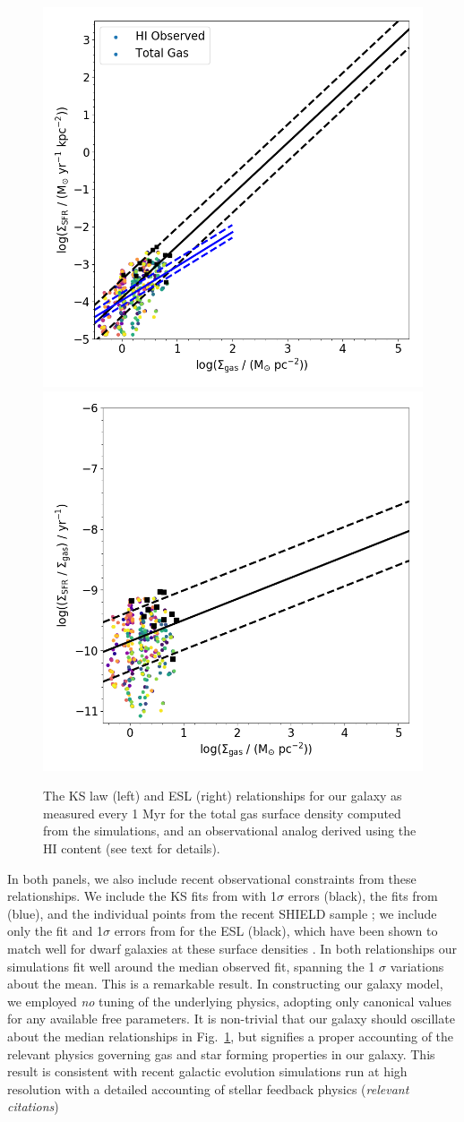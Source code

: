 \documentclass[twocolumn]{aastex61}
\begin{document}
\begin{figure}
\centering
\includegraphics[width=0.475\linewidth]{all_gas_schmidt_law_evolution}
\includegraphics[width=0.475\linewidth]{all_gass_efficiency_evolution}
\caption{The KS law (left) and ESL (right) relationships for our galaxy as measured every 1 Myr for the total gas surface density computed from the simulations, and an observational analog derived using the HI content (see text for details).}
\label{fig:KS}
\end{figure}

In both panels, we also include recent observational constraints from these relationships. We include the KS fits from \citet{Shi2011} with 1$\sigma$ errors (black), the fits from \citet{Roychowdhury2014} (blue), and the individual points from the recent SHIELD sample \citep{Teich2016}; we include only the fit and 1$\sigma$ errors from \citep{Shi2011} for the ESL (black), which have been shown to match well for dwarf galaxies at these surface densities \citep{Roychowdhury2017}. In both relationships our simulations fit well around the median observed fit, spanning the 1 $\sigma$ variations about the mean. This is a remarkable result. In constructing our galaxy model, we employed \textit{no} tuning of the underlying physics, adopting only canonical values for any available free parameters. It is non-trivial that our galaxy should oscillate about the median relationships in Fig.~\ref{fig:KS}, but signifies a proper accounting of the relevant physics governing gas and star forming properties in our galaxy. This result is consistent with recent galactic evolution simulations run at high resolution with a detailed accounting of stellar feedback physics (\textit{relevant citations})
\end{document}

